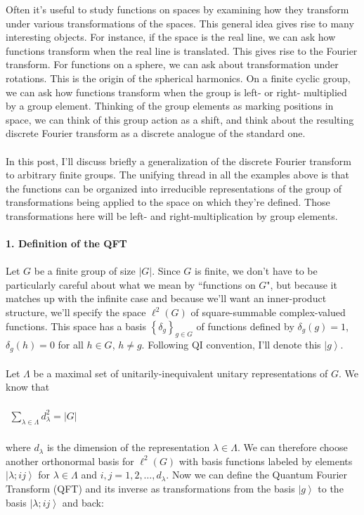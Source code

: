 \documentclass[]{article}
\begin{document}
\noindent Often it's useful to study functions on spaces by examining how they transform under various transformations of the spaces. This general idea gives rise to many interesting objects. For instance, if the space is the real line, we can ask how functions transform when the real line is translated. This gives rise to the Fourier transform. For functions on a sphere, we can ask about transformation under rotations. This is the origin of the spherical harmonics. On a finite cyclic group, we can ask how functions transform when the group is left- or right- multiplied by a group element. Thinking of the group elements as marking positions in space, we can think of this group action as a shift, and think about the resulting discrete Fourier transform as a discrete analogue of the standard one.\\
\\
In this post, I'll discuss briefly a generalization of the discrete Fourier transform to arbitrary finite groups. The unifying thread in all the examples above is that the functions can be organized into irreducible representations of the group of transformations being applied to the space on which they're defined. Those transformations here will be left- and right-multiplication by group elements.\\
\\
\textbf{1. Definition of the QFT}\\
\\
Let $G$ be a finite group of size $\left\vert G\right\vert$. Since $G$ is finite, we don't have to be particularly careful about what we mean by ``functions on $G$", but because it matches up with the infinite case and because we'll want an inner-product structure, we'll specify the space $\ell^2(G)$ of square-summable complex-valued functions. This space has a basis $\left\lbrace\delta_g\right\rbrace_{g\in G}$ of functions defined by $\delta_g(g)=1$, $\delta_g(h)=0$ for all $h\in G$, $h\neq g$. Following QI convention, I'll denote this $\left\vert g\right\rangle$.\\
\\
Let $\Lambda$ be a maximal set of unitarily-inequivalent unitary representations of $G$. We know that\\
\\
$\begin{aligned}
\sum_{\lambda\in \Lambda}d_\lambda^2=\left\vert G\right\vert
\end{aligned}$\\
\\
where $d_\lambda$ is the dimension of the representation $\lambda\in\Lambda$. We can therefore choose another orthonormal basis for $\ell^2(G)$ with basis functions labeled by elements $\left\vert\lambda;ij\right\rangle$ for $\lambda\in \Lambda$ and $i,j=1,2,\ldots, d_\lambda$. Now we can define the Quantum Fourier Transform (QFT) and its inverse as transformations from the basis $\left\vert g\right\rangle$ to the basis $\left\vert\lambda;ij\right\rangle$ and back:\\
\end{document}

